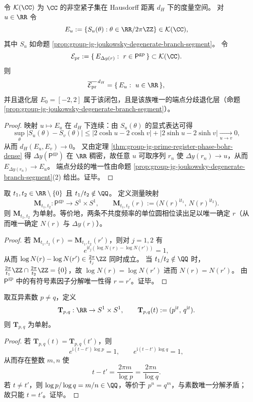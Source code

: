 \begin{theorem}[素数寄存器诱导的椭圆族在紧集空间中的闭包]\label{thm:group-jg-prime-register-ellipse-closure}
令 \(\mathcal K(\CC)\) 为 \(\CC\) 的非空紧子集在 Hausdorff 距离 \(d_H\) 下的度量空间。
对 \(u\in\RR\) 令
\[
E_u:=\{S_u(\theta):\theta\in\RR/2\pi\ZZ\}\in\mathcal K(\CC),
\]
其中 \(S_u\) 如命题 \ref{prop:group-jg-joukowsky-degenerate-branch-segment}。
令
\[
\mathcal E_{\mathrm{pr}}:=\{\,E_{\Delta y(r)}:\ r\in \mathsf{P}^{\mathrm{gp}}\,\}\subset \mathcal K(\CC).
\]
则
\[
\overline{\mathcal E_{\mathrm{pr}}}^{\,d_H}=\{\,E_u:\ u\in\RR\,\},
\]
并且退化层 \(E_0=[-2,2]\) 属于该闭包，且是该族唯一的端点分歧退化层（命题 \ref{prop:group-jg-joukowsky-degenerate-branch-segment}）。
\end{theorem}
\begin{proof}
映射 \(u\mapsto E_u\) 在 \(d_H\) 下连续：由 \(S_u(\theta)\) 的显式表达可得
\[
\sup_{\theta}|S_u(\theta)-S_v(\theta)|
\le |2\cosh u-2\cosh v|+|2\sinh u-2\sinh v|
\xrightarrow[u\to v]{}0,
\]
从而 \(d_H(E_u,E_v)\to 0\)。
又由定理 \ref{thm:group-jg-prime-register-phase-bohr-dense} 得 \(\Delta y(\mathsf{P}^{\mathrm{gp}})\) 在 \(\RR\) 稠密，故任意 \(u\) 可取序列 \(r_n\) 使 \(\Delta y(r_n)\to u\)，从而 \(E_{\Delta y(r_n)}\to E_u\)。
端点分歧的唯一性由命题 \ref{prop:group-jg-joukowsky-degenerate-branch-segment}(2) 给出。证毕。
\end{proof}

\begin{theorem}[两频单位圆相位读出对寄存器态的单射性]\label{thm:group-jg-twofrequency-circle-readout-injective}
取 \(t_1,t_2\in\RR\setminus\{0\}\) 且 \(t_1/t_2\notin\QQ\)。
定义测量映射
\[
\mathbf M_{t_1,t_2}:\mathsf{P}^{\mathrm{gp}}\to S^1\times S^1,\qquad
\mathbf M_{t_1,t_2}(r):=\bigl(N(r)^{\mathrm{i}t_1},\,N(r)^{\mathrm{i}t_2}\bigr).
\]
则 \(\mathbf M_{t_1,t_2}\) 为单射。等价地，两条不共度频率的单位圆相位读出足以唯一确定 \(r\)（从而唯一确定 \(N(r)\) 与 \(\Delta y(r)\)）。
\end{theorem}
\begin{proof}
若 \(\mathbf M_{t_1,t_2}(r)=\mathbf M_{t_1,t_2}(r')\)，则对 \(j=1,2\) 有
\[
e^{\mathrm{i}t_j(\log N(r)-\log N(r'))}=1,
\]
从而 \(\log N(r)-\log N(r')\in \tfrac{2\pi}{t_j}\ZZ\) 同时成立。
当 \(t_1/t_2\notin\QQ\) 时，
\(
\tfrac{2\pi}{t_1}\ZZ\cap\tfrac{2\pi}{t_2}\ZZ=\{0\}
\)，故 \(\log N(r)=\log N(r')\) 进而 \(N(r)=N(r')\)。
由 \(\mathsf{P}^{\mathrm{gp}}\) 中的有符号素因子分解唯一性得 \(r=r'\)。证毕。
\end{proof}

\begin{theorem}\label{thm:group-jg-two-prime-euler-phase-injective}
取互异素数 \(p\neq q\)，定义
\[
\mathbf T_{p,q}:\RR\to S^1\times S^1,\qquad
\mathbf T_{p,q}(t):=(p^{\mathrm{i}t},\,q^{\mathrm{i}t}).
\]
则 \(\mathbf T_{p,q}\) 为单射。
\end{theorem}
\begin{proof}
若 \(\mathbf T_{p,q}(t)=\mathbf T_{p,q}(t')\)，则
\[
e^{\mathrm{i}(t-t')\log p}=1,\qquad e^{\mathrm{i}(t-t')\log q}=1,
\]
从而存在整数 \(m,n\) 使
\[
t-t'=\frac{2\pi m}{\log p}=\frac{2\pi n}{\log q}.
\]
若 \(t\neq t'\)，则 \(\log p/\log q=m/n\in\QQ\)，等价于 \(p^n=q^m\)，与素数唯一分解矛盾；故只能 \(t=t'\)。证毕。
\end{proof}

